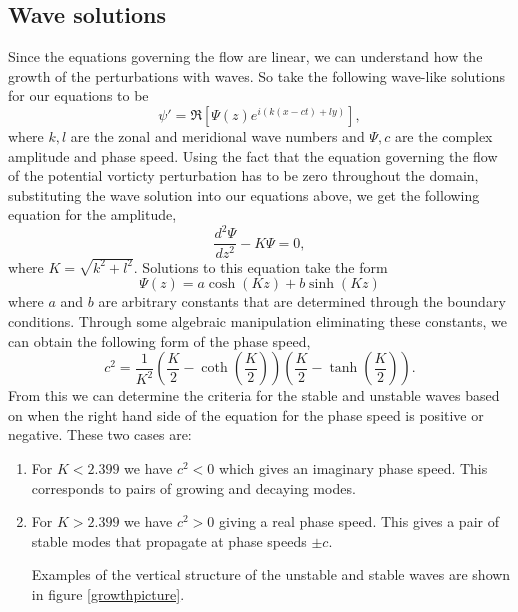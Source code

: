 \documentclass[a4paper,12pt]{article}
\begin{document}
\subsection{Wave solutions}
Since the equations governing the flow are linear, we can understand how the growth of the perturbations with waves. So take the following wave-like solutions for our equations to be
\begin{equation}
  \psi' = \Re\left[\Psi(z)e^{i(k(x-ct)+ly)}\right],
\end{equation}
where $k,l$ are the zonal and meridional wave numbers and $\Psi,c$ are the complex amplitude and phase speed. Using the fact that the equation governing the flow of the potential vorticty perturbation has to be zero throughout the domain, substituting the wave solution into our equations above, we get the following equation for the amplitude, 
\begin{equation}
  \frac{d^2\Psi}{dz^2} - K\Psi = 0,
\end{equation}
where $K=\sqrt{k^2+l^2}$. Solutions to this equation take the form 
\begin{equation}
  \Psi(z) = a\cosh(Kz)+b\sinh(Kz)
\end{equation}
where $a$ and $b$ are arbitrary constants that are determined through the boundary conditions. Through some algebraic manipulation eliminating these constants, we can obtain the following form of the phase speed,
\begin{equation}
  c^2 = \frac{1}{K^2}\left(\frac{K}{2}-\coth\left(\frac{K}{2}\right)\right)\left(\frac{K}{2}-\tanh\left(\frac{K}{2}\right)\right).
  \label{phasespeed}
\end{equation}
From this we can determine the criteria for the stable and unstable waves based on when the right hand side of the equation for the phase speed is positive or negative. These two cases are:
\begin{enumerate}
  \item For $K<2.399$ we have $c^2<0$ which gives an imaginary phase speed. This corresponds to pairs of growing and decaying modes. 
  \item For $K>2.399$ we have $c^2>0$ giving a real phase speed. This gives a pair of stable modes that propagate at phase speeds $\pm c$. 
  
  Examples of the vertical structure of the unstable and stable waves are shown in figure \ref{growthpicture}.
\end{enumerate}
\end{document}

